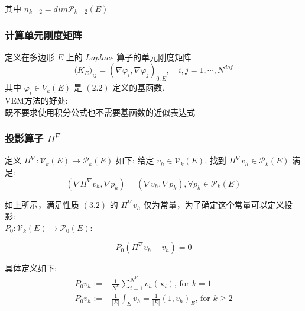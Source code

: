 \documentclass[12pt]{article}
\begin{document}
\begin{CJK}{UTF8}{gkai}
    其中 $n_{k-2} = dim\mathcal{P}_{k - 2}(E)$\\
    
   \subsubsection{计算单元刚度矩阵}
  
    定义在多边形 $E$ 上的 $Laplace$ 算子的单元刚度矩阵\\
    \begin{equation}
    \mathbf(K_E)_{ij} = (\nabla\varphi_i, \nabla\varphi_j)_{0,E},\quad i,j = 1,\cdots,N^{dof}
    \end{equation}
    其中 $\varphi_i \in V_k(E)$ 是 $(2.2)$ 定义的基函数. \\
    
    VEM方法的好处:\\
    
    既不要求使用积分公式也不需要基函数的近似表达式\\
    
     \subsubsection{投影算子 $\Pi^{\nabla}$}
    
    定义 $\Pi^\nabla: \mathcal V_k(E)\rightarrow \mathcal{P}_k(E)$ 如下: 给定  $ v_h \in
    \mathcal V_k(E)$, 找到 $\Pi^\nabla v_h \in \mathcal{P}_k(E)$ 满足: \\
    \begin{equation}
    (\nabla \Pi^\nabla v_h, \nabla p_k) = (\nabla v_h, \nabla p_k), \forall p_k\in\mathcal{P}_k(E)
    \end{equation}
    
    如上所示，满足性质 $(3.2)$ 的 $\Pi^{\nabla}v_h$ 仅为常量，为了确定这个常量可以定义投影: \\
    $ P_0: \mathcal V_k(E) \rightarrow
    \mathcal{P}_0(E)$:
    
    \begin{equation}
    P_0(\Pi^\nabla v_h - v_h) = 0
    \end{equation}
    
    具体定义如下: \\
    \begin{equation}
    \begin{aligned}
    P_0 v_h :=& \frac{1}{N^V}\sum_{i=1}^{N^V} v_h(\mathbf x_i)\text{, for } k=1 \\
    P_0 v_h :=& \frac{1}{|E|} \int_{E}v_h = \frac{1}{|E|} (1, v_h)_E\text{, for } k\geq 2
    \end{aligned}
    \end{equation}
    

\end{CJK}
\end{document}
